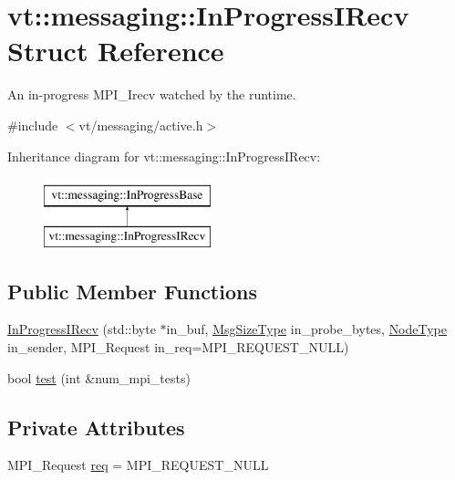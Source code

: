 \hypertarget{structvt_1_1messaging_1_1_in_progress_i_recv}{}\section{vt\+:\+:messaging\+:\+:In\+Progress\+I\+Recv Struct Reference}
\label{structvt_1_1messaging_1_1_in_progress_i_recv}


An in-\/progress M\+P\+I\+\_\+\+Irecv watched by the runtime.  




{\ttfamily \#include $<$vt/messaging/active.\+h$>$}

Inheritance diagram for vt\+:\+:messaging\+:\+:In\+Progress\+I\+Recv\+:\begin{figure}[H]
\begin{center}
\leavevmode
\includegraphics[height=2.000000cm]{structvt_1_1messaging_1_1_in_progress_i_recv}
\end{center}
\end{figure}
\subsection*{Public Member Functions}
\begin{DoxyCompactItemize}
\item 
\hyperlink{structvt_1_1messaging_1_1_in_progress_i_recv_a1206e5cae68fd12bb821dc2c4c8172d4}{In\+Progress\+I\+Recv} (std\+::byte $\ast$in\+\_\+buf, \hyperlink{namespacevt_a408e86a8c7c89309b52907dc5a513924}{Msg\+Size\+Type} in\+\_\+probe\+\_\+bytes, \hyperlink{namespacevt_a866da9d0efc19c0a1ce79e9e492f47e2}{Node\+Type} in\+\_\+sender, M\+P\+I\+\_\+\+Request in\+\_\+req=M\+P\+I\+\_\+\+R\+E\+Q\+U\+E\+S\+T\+\_\+\+N\+U\+LL)
\item 
bool \hyperlink{structvt_1_1messaging_1_1_in_progress_i_recv_ac5cabd7a87cc7c75d6870a2597c50a8c}{test} (int \&num\+\_\+mpi\+\_\+tests)
\end{DoxyCompactItemize}
\subsection*{Private Attributes}
\begin{DoxyCompactItemize}
\item 
M\+P\+I\+\_\+\+Request \hyperlink{structvt_1_1messaging_1_1_in_progress_i_recv_af1ee8d3168a064aa7749b986439b81e8}{req} = M\+P\+I\+\_\+\+R\+E\+Q\+U\+E\+S\+T\+\_\+\+N\+U\+LL
\end{DoxyCompactItemize}
